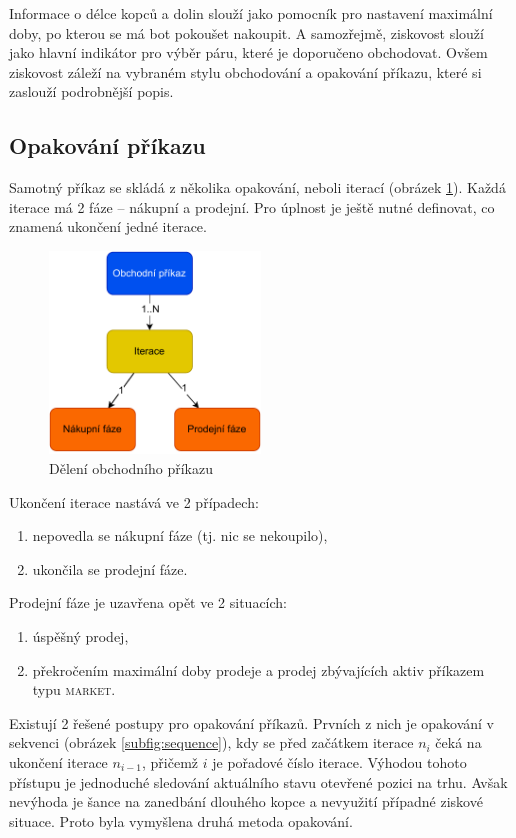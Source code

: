 Informace o délce kopců a dolin slouží jako pomocník pro nastavení maximální doby, po kterou se má bot pokoušet nakoupit. A samozřejmě, ziskovost slouží jako hlavní indikátor
pro výběr páru, které je doporučeno obchodovat. Ovšem ziskovost záleží na vybraném stylu obchodování a opakování příkazu, které si zaslouží podrobnější popis.

\subsection{Opakování příkazu}
Samotný příkaz se skládá z několika opakování, neboli iterací (obrázek \ref{fig:trade-order-parts}). Každá iterace má 2 fáze -- nákupní a prodejní. Pro úplnost je ještě nutné definovat, co znamená ukončení jedné iterace.
\begin{figure}[ht]
    \centering
    \includegraphics[width=0.5\textwidth]{Figures/trade-order-parts.pdf}
    \caption{Dělení obchodního příkazu}
    \label{fig:trade-order-parts}
\end{figure}
Ukončení iterace nastává ve 2 případech:
\begin{enumerate}
    \item nepovedla se nákupní fáze (tj. nic se nekoupilo),
    \item ukončila se prodejní fáze.
\end{enumerate}
Prodejní fáze je uzavřena opět ve 2 situacích:
\begin{enumerate}
    \item úspěšný prodej,
    \item překročením maximální doby prodeje a prodej zbývajících aktiv příkazem typu \textsc{market}.
\end{enumerate}

Existují 2 řešené postupy pro opakování příkazů. Prvních z nich je opakování v sekvenci (obrázek \ref{subfig:sequence}), kdy se před začátkem iterace $n_i$ čeká na ukončení iterace $n_{i - 1}$, přičemž $i$ je pořadové
číslo iterace. Výhodou tohoto přístupu je jednoduché sledování aktuálního stavu otevřené pozici na trhu. Avšak nevýhoda je šance na zanedbání dlouhého kopce a nevyužití případné ziskové situace.
Proto byla vymyšlena druhá metoda opakování.

